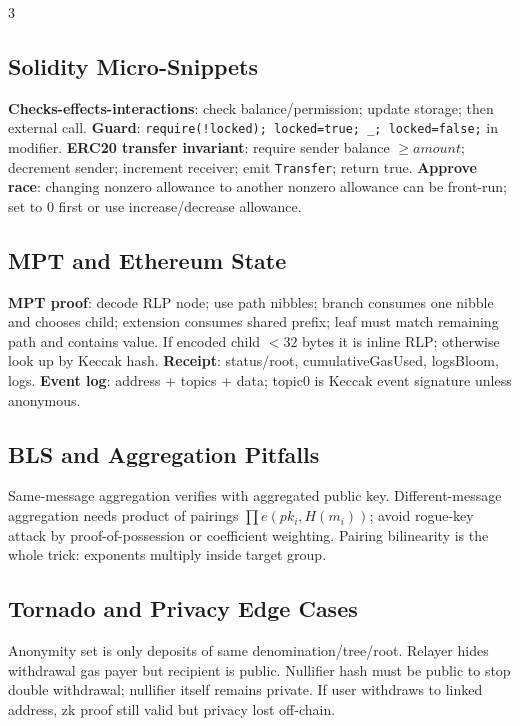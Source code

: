 \documentclass[8pt]{extarticle}
\newcommand{\term}[1]{\textbf{#1}}
\begin{document}
\begin{multicols*}{3}
\subsection{Solidity Micro-Snippets}
\term{Checks-effects-interactions}: check balance/permission; update storage; then external call. \term{Guard}: \texttt{require(!locked); locked=true; \_; locked=false;} in modifier. \term{ERC20 transfer invariant}: require sender balance $\ge amount$; decrement sender; increment receiver; emit \texttt{Transfer}; return true. \term{Approve race}: changing nonzero allowance to another nonzero allowance can be front-run; set to 0 first or use increase/decrease allowance.

\subsection{MPT and Ethereum State}
\term{MPT proof}: decode RLP node; use path nibbles; branch consumes one nibble and chooses child; extension consumes shared prefix; leaf must match remaining path and contains value. If encoded child $<32$ bytes it is inline RLP; otherwise look up by Keccak hash. \term{Receipt}: status/root, cumulativeGasUsed, logsBloom, logs. \term{Event log}: address + topics + data; topic0 is Keccak event signature unless anonymous.

\subsection{BLS and Aggregation Pitfalls}
Same-message aggregation verifies with aggregated public key. Different-message aggregation needs product of pairings $\prod e(pk_i,H(m_i))$; avoid rogue-key attack by proof-of-possession or coefficient weighting. Pairing bilinearity is the whole trick: exponents multiply inside target group.

\subsection{Tornado and Privacy Edge Cases}
Anonymity set is only deposits of same denomination/tree/root. Relayer hides withdrawal gas payer but recipient is public. Nullifier hash must be public to stop double withdrawal; nullifier itself remains private. If user withdraws to linked address, zk proof still valid but privacy lost off-chain.


\end{multicols*}
\end{document}
